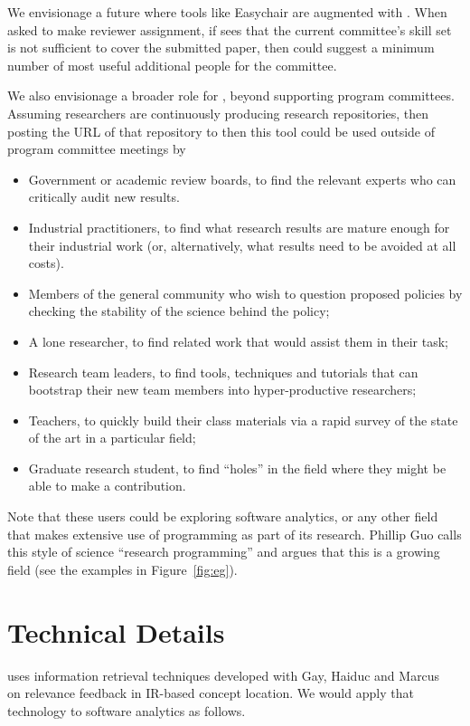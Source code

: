 \documentclass[journal]{IEEEtran}
\newcommand{\bi}{\begin{itemize}}
\newcommand{\ei}{\end{itemize}}
\newcommand{\fig}[1]{Figure~\ref{fig:#1}}
\begin{document}
We  envisionage a future where tools like
Easychair are augmented with {\IT}. When asked to make reviewer
assignment, 
if {\IT}  sees that the current committee's skill set is not sufficient
to cover the submitted paper, then 
{\IT} could suggest a minimum number of most useful additional people for the committee.

We also envisionage a broader role for {\IT}, beyond supporting program committees.
Assuming researchers are continuously producing research repositories, then posting
the URL of that repository to {\IT} then this tool could be used outside of program committee meetings by 
\bi
\item
 Government or academic review boards, to   find the relevant experts
   who can critically audit new results.
   \item
Industrial practitioners, to   find what research results are mature
   enough for their industrial work (or, alternatively, what results need to be avoided at all costs). 
   \item
   Members of the general community who wish to question proposed policies by
   checking the stability of the science behind the policy;
  \item
   A lone researcher, to find related work that would assist them in their task;
      \item
   Research  team leaders, to  find tools, techniques and tutorials that can bootstrap their new team members into hyper-productive researchers;
  \item
   Teachers, to  quickly build their class materials via a rapid
   survey of the state of the art in a particular field;
   \item
   Graduate research student, to  find ``holes'' in the field
   where they might be able to make a contribution.
   \ei
Note that these users could be exploring software analytics, or any other
field that makes extensive use of programming as part of its research.
Phillip Guo calls this style of science ``research programming'' and
argues that this is a growing field (see the examples in \fig{eg}).


\section{Technical Details} 
{\IT}  uses information retrieval techniques developed       with Gay, Haiduc and Marcus~\cite{me09k} on relevance feedback in IR-based concept
location.  We would apply that technology to software analytics
as follows.
\end{document}
